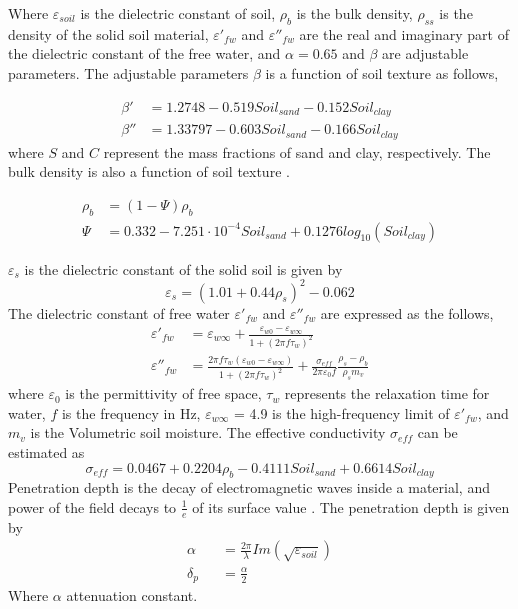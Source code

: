 \documentclass[draftcls]{IEEEtran}
\begin{document}
Where $\varepsilon_{soil}$ is the dielectric constant of soil, $\rho_b$ is the bulk density, $\rho_{ss}$ is the density of the solid soil material, $\varepsilon'_{fw}$ and $\varepsilon''_{fw}$ are the real and imaginary part of the dielectric constant of the free water, and $\alpha=0.65$ and $\beta$ are adjustable parameters. The adjustable parameters $\beta$ is a function of soil texture as follows,

\begin{equation}
\begin{split}
	\beta' &= 1.2748-0.519Soil_{sand}-0.152Soil_{clay} \\
    \beta'' &=1.33797-0.603Soil_{sand}-0.166Soil_{clay}
 \end{split}
\end{equation}
where $S$ and $C$ represent the mass fractions of sand and clay, respectively. The bulk density is also a function of soil texture \cite{Saxton:1986}.

\begin{equation} \label{eq: bulk_density}
\begin{split}
	 \rho_b &= (1-\Psi)\rho_b \\
	  \Psi &= 0.332 - 7.251 \cdot 10^{-4} Soil_{sand} + 0.1276 log_{10}(Soil_{clay})
\end{split}
\end{equation}

$\varepsilon_{s} $ is the dielectric constant of the solid soil is given by
\begin{equation}
	\varepsilon_s = (1.01+0.44\rho_s)^2-0.062
\end{equation}
The dielectric constant of free water $\varepsilon'_{fw}$ and $\varepsilon''_{fw}$ are expressed as the follows,
\begin{equation}
\begin{split}
	\varepsilon'_{fw} &=\varepsilon_{w\infty} + \frac{\varepsilon_{w0}-\varepsilon_{w\infty}}{1+(2 \pi f \tau_w)^2} \\
    \varepsilon''_{fw} &=\frac{2 \pi f \tau_w(\varepsilon_{w0}-\varepsilon_{w\infty})}{1+(2 \pi f \tau_w)^2} + \frac{\sigma_{eff}}{2 \pi \varepsilon_0 f} \frac{\rho_s-\rho_b}{\rho_s m_v} 
\end{split}
\end{equation}
where $\varepsilon_0$ is the permittivity of free space, $\tau_w$ represents the relaxation time for water, $f$ is the frequency in Hz, $\varepsilon_{w\infty}$ = 4.9 is the high-frequency limit of $\varepsilon'_{fw}$, and $m_v$ is the Volumetric soil moisture. The effective conductivity $\sigma_{eff}$ can be estimated as
\begin{equation}
	\sigma_{eff} = 0.0467+0.2204\rho_b-0.4111Soil_{sand}+0.6614Soil_{clay}
\end{equation}
Penetration depth is the decay of electromagnetic waves inside a material, and power of the field decays to $\frac{1}{e}$ of its surface value \cite{Ulaby:1981} . The penetration depth is given by
\begin{eqnarray}
	\alpha &&= \frac{2\pi}{\lambda} Im(\sqrt{\varepsilon_{soil}}) \\
    \delta_p &&= \frac{\alpha}{2}
\end{eqnarray}
Where  $\alpha$ attenuation constant.
\end{document}
